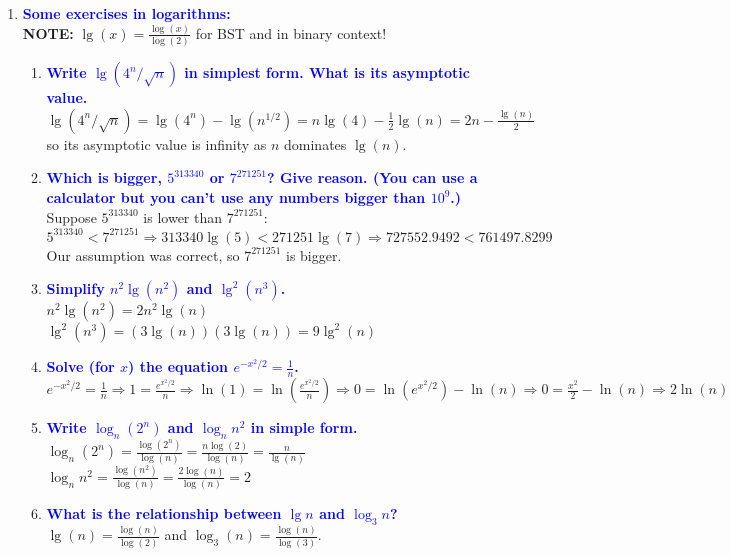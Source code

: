 \documentclass[11pt]{article}
\begin{document}
\begin{enumerate}
\item \textbf{\textcolor{blue}{Some exercises in logarithms:}}
    \\ \textbf{NOTE: } $\lg(x) = \frac{\log(x)}{\log(2)}$ for BST and in binary context!
    \begin{enumerate}
    \item \textbf{\textcolor{blue}{Write $\lg(4^n/\sqrt{n})$ in simplest form.  What is its asymptotic value.}}
        \\ $\lg(4^n/\sqrt{n}) = \lg(4^n) - \lg(n^{1/2}) = n\lg(4) - \frac{1}{2}\lg(n) = 2n - \frac{\lg(n)}{2}$ so its asymptotic value is infinity as $n$ dominates $\lg(n)$.
    \item \textbf{\textcolor{blue}{Which is bigger, $5^{313340}$ or $7^{271251}$? Give reason. (You can use a calculator but you can't use any numbers bigger than $10^9$.)}}
        \\ Suppose $5^{313340}$ is lower than $7^{271251}$:
        \\ $5^{313340} < 7^{271251} \Rightarrow 313340\lg(5) < 271251\lg(7) \Rightarrow 727552.9492 < 761497.8299$
        \\ Our assumption was correct, so $7^{271251}$ is bigger.
    \item \textbf{\textcolor{blue}{Simplify $n^2\lg(n^2)$ and $\lg^2(n^3)$.}}
        \\ $n^2\lg(n^2) = 2n^2\lg(n)$
        \\ $\lg^2(n^3) = (3\lg(n))(3\lg(n)) = 9\lg^2(n)$
    \item \textbf{\textcolor{blue}{Solve (for $x$) the equation $e^{-x^2/2}=\frac{1}{n}$.}}
        \\ $e^{-x^2/2}=\frac{1}{n} \Rightarrow 1=\frac{e^{x^2/2}}{n} \Rightarrow \ln(1)=\ln(\frac{e^{x^2/2}}{n}) \Rightarrow 0 = \ln(e^{x^2/2}) - \ln(n) \Rightarrow 0 = \frac{x^2}{2} - \ln(n) \Rightarrow 2\ln(n) = x^2 \Rightarrow x = \mp \sqrt{2\ln(n)}$
    \item \textbf{\textcolor{blue}{Write $\log_n(2^n)$ and $\log_nn^2$ in simple form.}}
        \\ $\log_n(2^n) = \frac{\log(2^n)}{\log(n)} = \frac{n\log(2)}{\log(n)} = \frac{n}{\lg(n)}$
        \\ $\log_nn^2 = \frac{\log(n^2)}{\log(n)} = \frac{2\log(n)}{\log(n)} = 2$
    \item \textbf{\textcolor{blue}{What is the relationship between $\lg n$ and $\log_3n$?}}
        \\ $\lg(n) = \frac{\log(n)}{\log(2)}$ and $\log_3(n) = \frac{\log(n)}{\log(3)}$.

\end{enumerate}
\end{enumerate}
\end{document}
